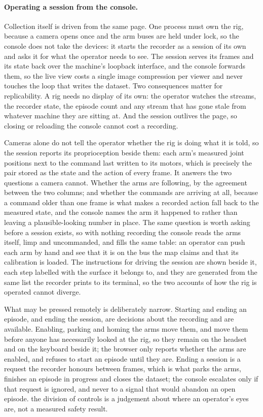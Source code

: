 \paragraph{Operating a session from the console.} Collection itself is driven
from the same page. One process must own the rig, because a camera opens once
and the arm buses are held under lock, so the console does not take the devices:
it starts the recorder as a session of its own and asks it for what the operator
needs to see. The session serves its frames and its state back over the
machine's loopback interface, and the console forwards them, so the live view
costs a single image compression per viewer and never touches the loop that
writes the dataset. Two consequences matter for replicability. A rig needs no
display of its own: the operator watches the streams, the recorder state, the
episode count and any stream that has gone stale from whatever machine they are
sitting at. And the session outlives the page, so closing or reloading the
console cannot cost a recording.

Cameras alone do not tell the operator whether the rig is doing what it is
told, so the session reports its proprioception beside them: each arm's
measured joint positions next to the command last written to its motors, which
is precisely the pair stored as the state and the action of every frame. It
answers the two questions a camera cannot. Whether the arms are following, by
the agreement between the two columns; and whether the commands are arriving at
all, because a command older than one frame is what makes a recorded action
fall back to the measured state, and the console names the arm it happened to
rather than leaving a plausible-looking number in place. The same question is worth asking before a session
exists, so with nothing recording the console reads the arms itself, limp and
uncommanded, and fills the same table: an operator can push each arm by hand
and see that it is on the bus the map claims and that its calibration is
loaded. The instructions for driving the session are shown beside it, each step
labelled with the surface it belongs to, and they are generated from the same
list the recorder prints to its terminal, so the two accounts of how the rig is
operated cannot diverge.

What may be pressed remotely is deliberately narrow. Starting and ending an
episode, and ending the session, are decisions about the recording and are
available. Enabling, parking and homing the arms move them, and move them
before anyone has necessarily looked at the rig, so they remain on the headset
and on the keyboard beside it; the browser only reports whether the arms are
enabled, and refuses to start an episode until they are. Ending a session is a
request the recorder honours between frames, which is what parks the arms,
finishes an episode in progress and closes the dataset; the console escalates
only if that request is ignored, and never to a signal that would abandon an
open episode. \unjustified{} the division of controls is a judgement about
where an operator's eyes are, not a measured safety result.

